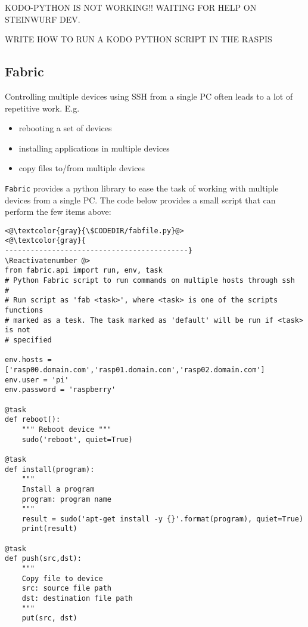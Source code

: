 KODO-PYTHON IS NOT WORKING!! WAITING FOR HELP ON STEINWURF DEV.

WRITE HOW TO RUN A KODO PYTHON SCRIPT IN THE RASPIS

\subsection{Fabric}

Controlling multiple devices using \ac{SSH} from a single \ac{PC}
often leads to a lot of repetitive work. E.g.

\begin{itemize}
    \item rebooting a set of devices
    \item installing applications in multiple devices
    \item copy files to/from multiple devices
\end{itemize}

\texttt{Fabric} provides a python library to ease the task of working
with multiple devices from a single \ac{PC}. The code below provides
a small script that can perform the few items above:



\Suppressnumber\begin{lstlisting}[]
<@\textcolor{gray}{\$CODEDIR/fabfile.py}@>
<@\textcolor{gray}{
-------------------------------------------}
\Reactivatenumber @>
from fabric.api import run, env, task
# Python Fabric script to run commands on multiple hosts through ssh
#
# Run script as 'fab <task>', where <task> is one of the scripts functions
# marked as a tesk. The task marked as 'default' will be run if <task> is not
# specified

env.hosts = ['rasp00.domain.com','rasp01.domain.com','rasp02.domain.com']
env.user = 'pi'
env.password = 'raspberry'

@task
def reboot():
    """ Reboot device """
    sudo('reboot', quiet=True)

@task
def install(program):
    """
    Install a program
    program: program name
    """
    result = sudo('apt-get install -y {}'.format(program), quiet=True)
    print(result)

@task
def push(src,dst):
    """
    Copy file to device
    src: source file path
    dst: destination file path
    """
    put(src, dst)

\end{lstlisting}
\FloatBarrier

